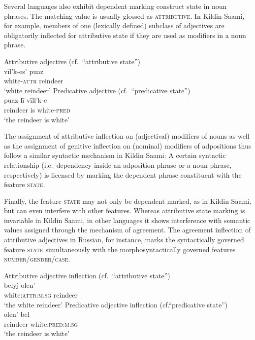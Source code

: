 Several languages also exhibit dependent marking construct state in noun phrases. The matching value is usually glossed as \textsc{attributive}. In Kildin Saami, for example, members of one (lexically defined) subclass of adjectives are obligatorily inflected for attributive state if they are used as modifiers in a noun phrase.
\begin{exe}
\ex\label{state np kildin}
\begin{xlist}
\ex	
\rm{Attributive adjective (cf.~“attributive state”)}\\
\gll 	vīl'k-es'		puaz\\
	white-\textsc{attr}	reindeer\\
\glt 	‘white reindeer’
\ex	
\rm{Predicative adjective (cf.~“predicative state”)}\\
\gll	puaz lī vīll'k-e\\
	reindeer is white-\textsc{pred}\\
\glt	‘the reindeer is white’
\end{xlist}
\end{exe}
The assignment of attributive inflection on (adjectival) modifiers of nouns as well as the assignment of genitive inflection on (nominal) modifiers of adpositions thus follow a similar syntactic mechanism in Kildin Saami: A certain syntactic relationship (i.e.~dependency inside an adposition phrase or a noun phrase, respectively) is licensed by marking the dependent phrase constituent with the feature \textsc{state}.

Finally, the feature \textsc{state} may not only be dependent marked, as in Kildin Saami, but can even interfere with other features. Whereas attributive state marking is invariable in Kildin Saami, in other languages it shows interference with semantic values assigned through the mechanism of agreement. The agreement inflection of attributive adjectives in Russian, for instance, marks the syntactically governed feature \textsc{state} simultaneously with the morphosyntactically governed features \textsc{number/gender/case}.
\begin{exe}
\ex\label{state np russian}
\begin{xlist}
\ex 
\rm{Attributive adjective inflection (cf.~“attributive state”)}\\
\gll 	belyj	olen'\\
	white:\textsc{attr:m.sg}	reindeer\\
\glt 	‘the white reindeer’
\ex	
\rm{Predicative adjective inflection (cf.“predicative state”)}\\
\gll	olen' bel\\
	reindeer white:\textsc{pred:m.sg}\\
\glt	‘the reindeer is white’
\end{xlist}
\end{exe}

